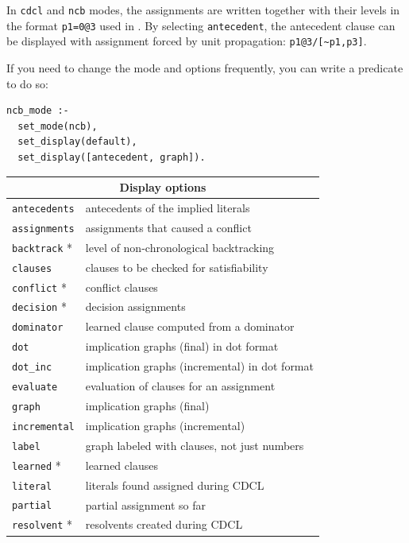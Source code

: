 \documentclass[11pt]{report}
\newcommand*{\p}[1]{\textup{\texttt{#1}}}
\begin{document}
In \p{cdcl} and \p{ncb} modes, the assignments are written together with
their levels in the format \p{p1=0@3} used in \cite{mlm}.
By selecting \p{antecedent}, the antecedent clause can be displayed with
assignment forced by unit propagation:
\verb+p1@3/[~p1,p3]+.

If you need to change the mode and options frequently, you
can write a predicate to do so:
\begin{verbatim}
ncb_mode :-
  set_mode(ncb),
  set_display(default),
  set_display([antecedent, graph]).
\end{verbatim}

\begin{table}[tbp]
\begin{center}
\begin{tabular}{|l|l|}
\hline
\multicolumn{2}{|c|}{\textbf{\large Display options}}\\
\hline
\p{antecedents}&  antecedents of the implied literals\\
\p{assignments}& assignments that caused a conflict         \\
\p{backtrack} *&  level of non-chronological backtracking    \\
\p{clauses}   &  clauses to be checked for satisfiability   \\
\p{conflict} * &  conflict clauses                           \\
\p{decision} * &  decision assignments                       \\
\p{dominator} &  learned clause computed from a dominator   \\
\p{dot}       &  implication graphs (final) in dot format           \\
\p{dot\_inc}  &  implication graphs (incremental) in dot format\\
\p{evaluate}  &  evaluation of clauses for an assignment    \\
\p{graph}     &  implication graphs (final)                 \\
\p{incremental}& implication graphs (incremental)           \\
\p{label}     &  graph labeled with clauses, not just numbers\\
\p{learned} *  &  learned clauses                            \\
\p{literal}   &  literals found assigned during CDCL        \\
\p{partial}   &  partial assignment so far                  \\
\p{resolvent} * &  resolvents created during CDCL             \\

\end{tabular}
\end{center}
\end{table}
\end{document}
